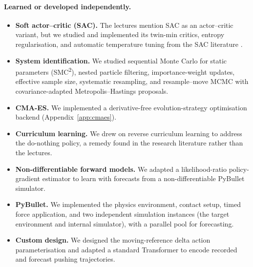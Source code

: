 \documentclass[12pt]{article}
\begin{document}
\paragraph{Learned or developed independently.}
\begin{itemize}[leftmargin=1.4em,itemsep=3pt,topsep=3pt]
\item \textbf{Soft actor--critic (SAC).} The lectures mention SAC as an actor--critic variant, but we studied and implemented its twin-min critics, entropy regularisation, and automatic temperature tuning from the SAC literature \cite{sac,sacauto}.
\item \textbf{System identification.} We studied sequential Monte Carlo for static parameters (SMC\textsuperscript{2}), nested particle filtering, importance-weight updates, effective sample size, systematic resampling, and resample--move MCMC with covariance-adapted Metropolis--Hastings proposals.
\item \textbf{CMA-ES.} We implemented a derivative-free evolution-strategy optimisation backend (Appendix~\ref{app:cmaes}).
\item \textbf{Curriculum learning.} We drew on reverse curriculum learning to address the do-nothing policy, a remedy found in the research literature rather than the lectures.
\item \textbf{Non-differentiable forward models.} We adapted a likelihood-ratio policy-gradient estimator to learn with forecasts from a non-differentiable PyBullet simulator.
\item \textbf{PyBullet.} We implemented the physics environment, contact setup, timed force application, and two independent simulation instances (the target environment and internal simulator), with a parallel pool for forecasting.
\item \textbf{Custom design.} We designed the moving-reference delta action parameterisation and adapted a standard Transformer \cite{transformer} to encode recorded and forecast pushing trajectories.
\end{itemize}
\end{document}
